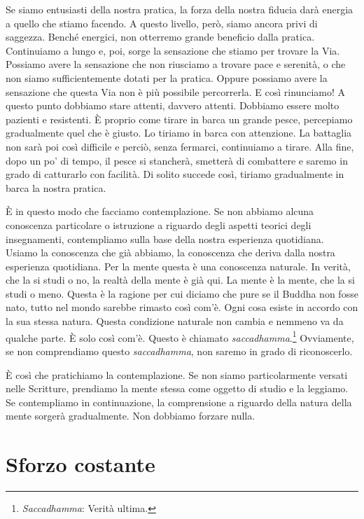 Se siamo entusiasti della nostra pratica, la forza della nostra fiducia
darà energia a quello che stiamo facendo. A questo livello, però, siamo
ancora privi di saggezza. Benché energici, non otterremo grande
beneficio dalla pratica. Continuiamo a lungo e, poi, sorge la sensazione
che stiamo per trovare la Via. Possiamo avere la sensazione che non
riusciamo a trovare pace e serenità, o che non siamo sufficientemente
dotati per la pratica. Oppure possiamo avere la sensazione che questa
Via non è più possibile percorrerla. E così rinunciamo! A questo punto
dobbiamo stare attenti, davvero attenti. Dobbiamo essere molto pazienti
e resistenti. È proprio come tirare in barca un grande pesce, percepiamo
gradualmente quel che è giusto. Lo tiriamo in barca con attenzione. La
battaglia non sarà poi così difficile e perciò, senza fermarci,
continuiamo a tirare. Alla fine, dopo un po' di tempo, il pesce si
stancherà, smetterà di combattere e saremo in grado di catturarlo con
facilità. Di solito succede così, tiriamo gradualmente in barca la
nostra pratica.

È in questo modo che facciamo contemplazione. Se non abbiamo alcuna
conoscenza particolare o istruzione a riguardo degli aspetti teorici
degli insegnamenti, contempliamo sulla base della nostra esperienza
quotidiana. Usiamo la conoscenza che già abbiamo, la conoscenza che
deriva dalla nostra esperienza quotidiana. Per la mente questa è una
conoscenza naturale. In verità, che la si studi o no, la realtà della
mente è già qui. La mente è la mente, che la si studi o meno. Questa è
la ragione per cui diciamo che pure se il Buddha non fosse nato, tutto
nel mondo sarebbe rimasto così com'è. Ogni cosa esiste in accordo con la
sua stessa natura. Questa condizione naturale non cambia e nemmeno va da
qualche parte. È solo così com'è. Questo è chiamato
\emph{saccadhamma}.\footnote{\emph{Saccadhamma}: Verità ultima.}
Ovviamente, se non comprendiamo questo \emph{saccadhamma}, non saremo in
grado di riconoscerlo.

È così che pratichiamo la contemplazione. Se non siamo particolarmente
versati nelle Scritture, prendiamo la mente stessa come oggetto di
studio e la leggiamo. Se contempliamo in continuazione, la comprensione
a riguardo della natura della mente sorgerà gradualmente. Non dobbiamo
forzare nulla.

\section{Sforzo costante}


